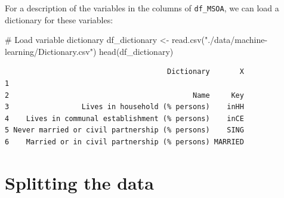 \documentclass[
  letterpaper,
  DIV=11,
  numbers=noendperiod]{scrreprt}
\newenvironment{Shaded}{\begin{snugshade}}{\end{snugshade}}
\newcommand{\AttributeTok}[1]{\textcolor[rgb]{0.40,0.45,0.13}{#1}}
\newcommand{\CommentTok}[1]{\textcolor[rgb]{0.37,0.37,0.37}{#1}}
\newcommand{\ConstantTok}[1]{\textcolor[rgb]{0.56,0.35,0.01}{#1}}
\newcommand{\FunctionTok}[1]{\textcolor[rgb]{0.28,0.35,0.67}{#1}}
\newcommand{\NormalTok}[1]{\textcolor[rgb]{0.00,0.23,0.31}{#1}}
\newcommand{\OtherTok}[1]{\textcolor[rgb]{0.00,0.23,0.31}{#1}}
\newcommand{\SpecialCharTok}[1]{\textcolor[rgb]{0.37,0.37,0.37}{#1}}
\newcommand{\StringTok}[1]{\textcolor[rgb]{0.13,0.47,0.30}{#1}}
\begin{document}
\begin{Shaded}
\end{Shaded}

For a description of the variables in the columns of \texttt{df\_MSOA},
we can load a dictionary for these variables:

\begin{Shaded}
\begin{Highlighting}[]
\CommentTok{\# Load variable dictionary}
\NormalTok{df\_dictionary }\OtherTok{\textless{}{-}} \FunctionTok{read.csv}\NormalTok{(}\StringTok{"./data/machine{-}learning/Dictionary.csv"}\NormalTok{)}
\FunctionTok{head}\NormalTok{(df\_dictionary)}
\end{Highlighting}
\end{Shaded}

\begin{verbatim}
                                      Dictionary       X
1                                                       
2                                           Name     Key
3                 Lives in household (% persons)    inHH
4    Lives in communal establishment (% persons)    inCE
5 Never married or civil partnership (% persons)    SING
6    Married or in civil partnership (% persons) MARRIED
\end{verbatim}

\hypertarget{splitting-the-data}{%
\section{Splitting the data}\label{splitting-the-data}}
\end{document}
